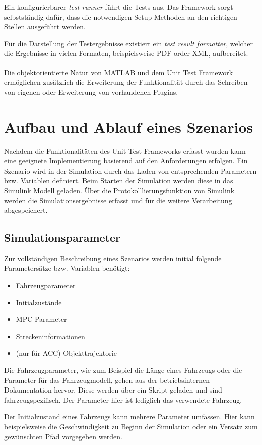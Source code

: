 Ein konfigurierbarer \textit{test runner} führt die Tests aus. Das Framework sorgt selbstständig dafür, dass die notwendigen Setup-Methoden an den richtigen Stellen ausgeführt werden.

Für die Darstellung der Testergebnisse existiert ein \textit{test result formatter}, welcher die Ergebnisse in vielen Formaten, beispielsweise PDF order XML, aufbereitet.

Die objektorientierte Natur von MATLAB\textsuperscript{\textregistered} und dem Unit Test Framework ermöglichen zusätzlich die Erweiterung der Funktionalität durch das Schreiben von eigenen oder Erweiterung von vorhandenen Plugins.

\section{Aufbau und Ablauf eines Szenarios} \label{sec:AufbauSzenario}

Nachdem die Funktionalitäten des Unit Test Frameworks erfasst wurden kann eine geeignete Implementierung basierend auf den Anforderungen erfolgen. Ein Szenario wird in der Simulation durch das Laden von entsprechenden Parametern bzw. Variablen definiert. Beim Starten der Simulation werden diese in das Simulink Modell geladen. Über die Protokolllierungsfunktion von Simulink werden die Simulationsergebnisse erfasst und für die weitere Verarbeitung abgespeichert.

\subsection{Simulationsparameter}
Zur vollständigen Beschreibung eines Szenarios werden initial folgende Parametersätze bzw. Variablen benötigt:
\begin{itemize}
	\item Fahrzeugparameter
	\item Initialzustände
	\item MPC Parameter
	\item Streckeninformationen
	\item (nur für ACC) Objekttrajektorie
\end{itemize}
Die Fahrzeugparameter, wie zum Beispiel die Länge eines Fahrzeugs oder die Parameter für das Fahrzeugmodell, gehen aus der betriebsinternen Dokumentation hervor. Diese werden über ein Skript geladen und sind fahrzeugspezifisch. Der Parameter hier ist lediglich das verwendete Fahrzeug.

Der Initialzustand eines Fahrzeugs kann mehrere Parameter umfassen. Hier kann beispielsweise die Geschwindigkeit zu Beginn der Simulation oder ein Versatz zum gewünschten Pfad vorgegeben werden.


